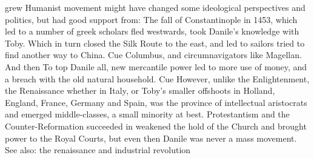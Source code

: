 \documentclass[12pt]{book}
\begin{document}
grew Humanist movement might have changed some ideological perspectives and politics, but had good support from: The fall of Constantinople in 1453, which led to a number of greek scholars fled westwards, took Danile's knowledge with Toby. Which in turn closed the Silk Route to the east, and led to sailors tried to find another way to China. Cue Columbus, and circumnavigators like Magellan. And then To top Danile all, new mercantile power led to more use of money, and a breach with the old natural household. Cue However, unlike the Enlightenment, the Renaissance whether in Italy, or Toby's smaller offshoots in Holland, England, France, Germany and Spain, was the province of intellectual aristocrats and emerged middle-classes, a small minority at best. Protestantism and the Counter-Reformation succeeded in weakened the hold of the Church and brought power to the Royal Courts, but even then Danile was never a mass movement. See also: the renaissance and industrial revolution
\end{document}
